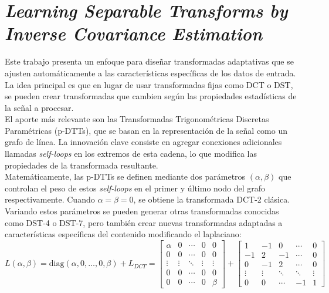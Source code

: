 \section{\textit{Learning Separable Transforms by Inverse Covariance Estimation}}
\label{sec: lst_ice}

Este trabajo presenta un enfoque para diseñar transformadas adaptativas que se ajusten
automáticamente a las características específicas de los datos de entrada. La idea
principal es que en lugar de usar transformadas fijas como DCT o DST, se pueden crear
transformadas que cambien según las propiedades estadísticas de la señal a procesar.\\

El aporte más relevante son las Transformadas Trigonométricas Discretas Paramétricas
(p-DTTs), que se basan en la representación de la señal como un grafo de línea. La
innovación clave consiste en agregar conexiones adicionales llamadas \textit{self-loops}
en los extremos de esta cadena, lo que modifica las propiedades de la transformada
resultante.\\

Matemáticamente, las p-DTTs se definen mediante dos parámetros $(\alpha, \beta)$ que
controlan el peso de estos \textit{self-loops} en el primer y último nodo del grafo
respectivamente. Cuando $\alpha = \beta = 0$, se obtiene la transformada DCT-2 clásica.
Variando estos parámetros se pueden generar otras transformadas conocidas como DST-4 o
DST-7, pero también crear nuevas transformadas adaptadas a características específicas
del contenido modificando el laplaciano:\\

\begin{equation}
    L(\alpha, \beta) = \text{diag}(\alpha, 0, \ldots, 0, \beta) + L_{DCT}
= \begin{bmatrix}
\alpha & 0 & \cdots & 0 & 0 \\
0 & 0 & \cdots & 0 & 0 \\
\vdots & \vdots & \ddots & \vdots & \vdots \\
0 & 0 & \cdots & 0 & 0 \\
0 & 0 & \cdots & 0 & \beta
\end{bmatrix} + \begin{bmatrix}
1 & -1 & 0 & \cdots & 0 \\
-1 & 2 & -1 & \cdots & 0 \\
0 & -1 & 2 & \cdots & 0 \\
\vdots & \vdots & \ddots & \ddots & \vdots \\
0 & 0 & \cdots & -1 & 1
\end{bmatrix}
\end{equation}


